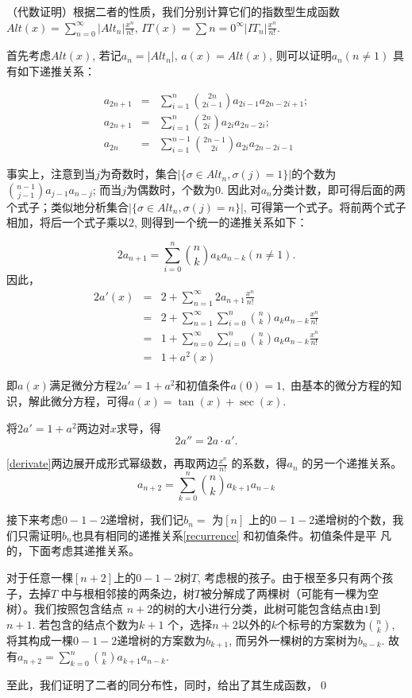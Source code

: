 \documentclass[a4paper,11pt]{article}
\def\pf{\noindent {\bf 证明\ }}
\begin{document}
{\pf （代数证明）根据二者的性质，我们分别计算它们的指数型生成函数$Alt(x)=\sum_{n=0}^{\infty}|Alt_n|\frac{x^n}{n!}$, $IT(x)=\sum{n=0}^{\infty}|IT_n|\frac{x^n}{n!}$.

首先考虑$Alt(x)$, 若记$a_n=|Alt_n|$, $a(x)=Alt(x)$, 则可以证明$a_n(n\neq1)$ 具有如下递推关系：

\begin{eqnarray*}
a_{2n+1}&=&\sum_{i=1}^{n}{2n\choose 2i-1}a_{2i-1}a_{2n-2i+1};\\
a_{2n+1}&=&\sum_{i=1}^{n}{2n\choose 2i}a_{2i}a_{2n-2i};\\
a_{2n}&=&\sum_{i=1}^{n-1}{2n-1\choose 2i}a_{2i}a_{2n-2i-1}
\end{eqnarray*}

事实上，注意到当$j$为奇数时，集合$|\{\sigma\in Alt_n,\sigma(j)=1\}|$的个数为${n-1\choose j-1}a_{j-1}a_{n-j}$; 而当$j$为偶数时，个数为$0.$ 因此对$a_n$分类计数，即可得后面的两个式子；类似地分析集合$|\{\sigma\in Alt_n,\sigma(j)=n\}|$, 可得第一个式子。将前两个式子相加，将后一个式子乘以$2$, 则得到一个统一的递推关系如下：

$$
2a_{n+1}=\sum_{i=0}^n{n\choose k}a_ka_{n-k}(n\neq1).
$$
因此，
\begin{eqnarray*}
2a'(x)&=&2+\sum_{n=1}^{\infty}2a_{n+1}\frac{x^n}{n!}\\
      &=&2+\sum_{n=1}^{\infty}\sum_{i=0}^n{n\choose k}a_k a_{n-k}\frac{x^n}{n!}\\
      &=&1+\sum_{n=0}^{\infty}\sum_{i=0}^n{n\choose k}a_k a_{n-k}\frac{x^n}{n!}\\
      &=&1+a^2(x)
\end{eqnarray*}

即$a(x)$满足微分方程$2a'=1+a^2$和初值条件$a(0)=1,$ 由基本的微分方程的知识，解此微分方程，可得$a(x)=\tan(x)+\sec(x).$

将$2a'=1+a^2$两边对$x$求导，得
\begin{equation}\label{derivate}
2a''=2a\cdot a'.
\end{equation}

\eqref{derivate}两边展开成形式幂级数，再取两边$\frac{x^n}{n!}$ 的系数，得$a_n$ 的另一个递推关系。
\begin{equation}\label{recurrence}
a_{n+2}=\sum_{k=0}^n{n\choose k}a_{k+1}a_{n-k}
\end{equation}

接下来考虑$0-1-2$递增树，我们记$b_n=$ 为$[n]$ 上的$0-1-2$递增树的个数，我们只需证明$b_n$也具有相同的递推关系\eqref{recurrence} 和初值条件。初值条件是平
凡的，下面考虑其递推关系。

对于任意一棵$[n+2]$上的$0-1-2$树$T$, 考虑根的孩子。由于根至多只有两个孩子，去掉$T$ 中与根相邻接的两条边，树$T$被分解成了两棵树（可能有一棵为空树）。我们按照包含结点
$n+2$的树的大小进行分类，此树可能包含结点由$1$到$n+1.$ 若包含的结点个数为$k+1$ 个，选择$n+2$以外的$k$个标号的方案数为$n\choose k$, 将其构成一棵$0-1-2$递增树的方案数为$b_{k+1}$, 而另外一棵树的方案树为$b_{n-k}$. 故有$
a_{n+2}=\sum_{k=0}^n{n\choose k}a_{k+1}a_{n-k}.
$

至此，我们证明了二者的同分布性，同时，给出了其生成函数，\qed
}
\end{document}
